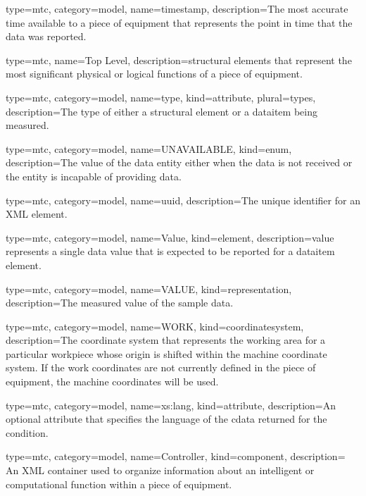 {
  type=mtc,
  category=model,
  name={timestamp},
  description={The most accurate time available to a piece of equipment that represents the point in time that the data was reported.}
}


{
  type=mtc,
  name={Top Level},
  description={\glspl{structural element} that represent the most significant physical or logical functions of a piece of equipment.}
}


{
  type=mtc,
  category=model,
  name={type},
  kind={attribute},
  plural={types},
  description={The type of either a \gls{structural element} or a \gls{dataitem} being measured.}
}


{
  type=mtc,
  category=model,
  name={UNAVAILABLE},
  kind={enum},
  description={The value of the \gls{data entity} either when the data is not received or the entity is incapable of providing data.}
}


{
  type=mtc,
  category=model,
  name={uuid},
  description={The unique identifier for an XML element.}
}



{
  type=mtc,
  category=model,
  name={Value},
  kind={element},
  description={\gls{value} represents a single data value that is expected to be reported for a \gls{dataitem} element. }
}


{
  type=mtc,
  category=model,
  name={VALUE},
  kind={representation},
  description={The measured value of the sample data.}
}


{
  type=mtc,
  category=model,
  name={WORK},
  kind={coordinatesystem},
  description={The coordinate system that represents the working area for a particular workpiece whose origin is shifted within the \gls{machine} coordinate system. If the \gls{work} coordinates are not currently defined in the piece of equipment, the \gls{machine} coordinates will be used.}
}


{
  type=mtc,
  category=model,
  name={xs:lang},
  kind={attribute},
  description={An optional attribute that specifies the language of the \gls{cdata} returned for the \gls{condition}.}
}


{
  type=mtc,
  category=model,
  name={Controller},
  kind={component},
  description= {An XML container used to organize information about an intelligent or computational function within a piece of equipment.}
}


